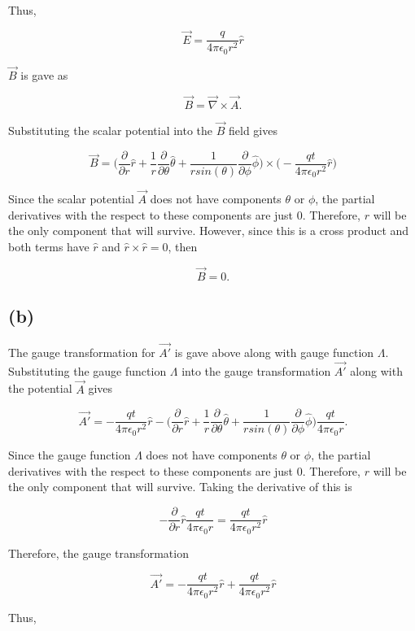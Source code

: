 \documentclass[11pt]{article}
\begin{document}
Thus,

$$
\Vec{E} = \frac{q}{4\pi\epsilon_{0}r^{2}}\hat{r}
$$

$\Vec{B}$ is gave as 

$$
\Vec{B} = \Vec{\nabla} \times \vec{A}.
$$

Substituting the scalar potential into the $\Vec{B}$ field gives

$$
\vec{B} = \Bigg(\frac{\partial}{\partial r} \hat{r} + \frac{1}{r} \frac{\partial}{\partial \theta} \hat{\theta} + \frac{1}{rsin(\theta)}\frac{\partial}{\partial \phi} \hat{\phi}\Bigg) 
\times 
\Bigg(-\frac{qt}{4\pi\epsilon_{0}r^{2}}\hat{r}\Bigg)
$$

Since the scalar potential $\vec{A}$ does not have components $\theta$ or $\phi$, the partial derivatives with the respect to these components are just 0. Therefore, $r$ will be the only component that will survive. However, since this is a cross product and both terms have $\hat{r}$ and $\hat{r} \times \hat{r} = 0$, then

$$
\vec{B} = 0.
$$

\subsection*{(b)}

The gauge transformation for $\vec{A'}$ is gave above along with gauge function $\Lambda$. Substituting the gauge function $\Lambda$ into the gauge transformation $\vec{A'}$ along with the potential $\vec{A}$ gives

$$
\vec{A'} = -\frac{qt}{4\pi\epsilon_{0}r^{2}}\hat{r} - 
\Bigg(\frac{\partial}{\partial r} \hat{r} + \frac{1}{r} \frac{\partial}{\partial \theta} \hat{\theta} + \frac{1}{rsin(\theta)}\frac{\partial}{\partial \phi} \hat{\phi}\Bigg)
\frac{qt}{4\pi\epsilon_{0}r}.
$$

Since the gauge function $\Lambda$ does not have components $\theta$ or $\phi$, the partial derivatives with the respect to these components are just 0. Therefore, $r$ will be the only component that will survive. Taking the derivative of this is

$$
-\frac{\partial}{\partial r} \hat{r} \frac{qt}{4\pi\epsilon_{0}r} = \frac{qt}{4\pi\epsilon_{0}r^{2}}\hat{r}
$$

Therefore, the gauge transformation

$$
\vec{A'} = -\frac{qt}{4\pi\epsilon_{0}r^{2}}\hat{r} + \frac{qt}{4\pi\epsilon_{0}r^{2}}\hat{r}
$$

Thus, 
\end{document}
